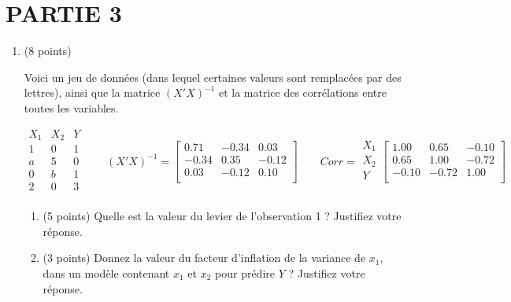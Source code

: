 \documentclass[11pt]{article}
\begin{document}
{\newpage 


\section*{PARTIE 3}

\begin{enumerate}

\item (8 points)

Voici un jeu de données (dans lequel certaines valeurs sont remplacées par des lettres), ainsi que la matrice $(X'X)^{-1}$ et la matrice des corrélations entre toutes les variables.
\bigskip

\hspace{-1cm}
$\begin{array}{ccc}
X_1 & X_2 & Y\\\hline
1 & 0 & 1 \\
a & 5 & 0 \\
0 & b & 1 \\
2 & 0 & 3 \\
\end{array}\qquad
(X'X)^{-1}=\left[
\begin{array}{ccc}
  0.71 &-0.34 & 0.03\\
 -0.34 & 0.35& -0.12\\
  0.03 &-0.12 & 0.10\\
\end{array}\right]\qquad
Corr=\begin{array}{c}
X_1 \\
X_2  \\
Y \\
\end{array}\left[
\begin{array}{rrr}
  1.00 & 0.65& -0.10\\
  0.65 & 1.00 &-0.72\\
 -0.10 &-0.72 & 1.00\\
\end{array}\right]
$

\begin{enumerate}
    \item (5 points)  Quelle est la valeur du levier de l'observation 1 ? Justifiez votre réponse.
    \vspace{4 in}
    \item (3 points)  Donnez la valeur du facteur d'inflation de la variance de $x_1$, dans un modèle contenant $x_1$ et $x_2$ pour prédire $Y$ ? Justifiez votre réponse.
\end{enumerate}


\end{enumerate}}
\end{document}

